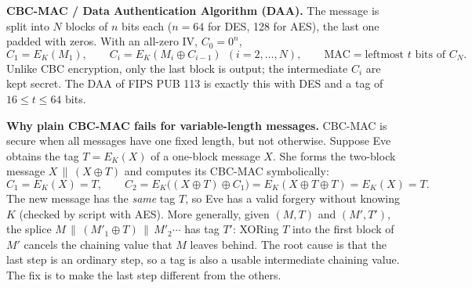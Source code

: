 \textbf{CBC-MAC / Data Authentication Algorithm (DAA).} The message is split into $N$ blocks of $n$ bits each ($n = 64$ for DES, 128 for AES), the last one padded with zeros. With an all-zero IV, $C_0 = 0^n$,
\[
C_1 = E_K(M_1), \qquad C_i = E_K(M_i \oplus C_{i-1})\ \ (i = 2, \dots, N), \qquad \mathrm{MAC} = \text{leftmost } t \text{ bits of } C_N .
\]
Unlike CBC encryption, only the last block is output; the intermediate $C_i$ are kept secret. The DAA of FIPS PUB 113 is exactly this with DES and a tag of $16 \le t \le 64$ bits.

\textbf{Why plain CBC-MAC fails for variable-length messages.} CBC-MAC is secure when all messages have one fixed length, but not otherwise. Suppose Eve obtains the tag $T = E_K(X)$ of a one-block message $X$. She forms the two-block message $X \,\|\, (X \oplus T)$ and computes its CBC-MAC symbolically:
\[
C_1 = E_K(X) = T, \qquad C_2 = E_K\big((X \oplus T) \oplus C_1\big) = E_K(X \oplus T \oplus T) = E_K(X) = T .
\]
The new message has the \emph{same} tag $T$, so Eve has a valid forgery without knowing $K$ (checked by script with AES). More generally, given $(M, T)$ and $(M', T')$, the splice $M \,\|\, (M'_1 \oplus T) \,\|\, M'_2 \cdots$ has tag $T'$: XORing $T$ into the first block of $M'$ cancels the chaining value that $M$ leaves behind. The root cause is that the last step is an ordinary step, so a tag is also a usable intermediate chaining value. The fix is to make the last step different from the others.

